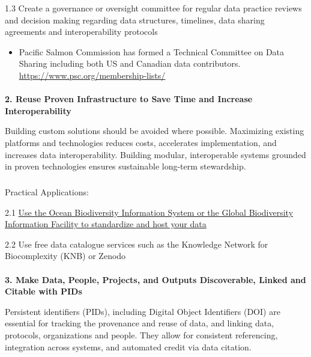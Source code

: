 \documentclass[
  letterpaper,
  DIV=11,
  numbers=noendperiod]{scrartcl}
\makeatletter
\let\oldparagraph\paragraph
\renewcommand{\paragraph}{
    \@ifstar
      \xxxParagraphStar
      \xxxParagraphNoStar
  }
\newcommand{\xxxParagraphStar}[1]{\oldparagraph*{#1}\mbox{}}
\newcommand{\xxxParagraphNoStar}[1]{\oldparagraph{#1}\mbox{}}
\let\oldsubparagraph\subparagraph
\renewcommand{\subparagraph}{
    \@ifstar
      \xxxSubParagraphStar
      \xxxSubParagraphNoStar
  }
\newcommand{\xxxSubParagraphStar}[1]{\oldsubparagraph*{#1}\mbox{}}
\newcommand{\xxxSubParagraphNoStar}[1]{\oldsubparagraph{#1}\mbox{}}
\providecommand{\tightlist}{%
  \setlength{\itemsep}{0pt}\setlength{\parskip}{0pt}}\usepackage{longtable,booktabs,array}
\makeatother
\begin{document}
1.3 Create a governance or oversight committee for regular data practice
reviews and decision making regarding data structures, timelines, data
sharing agreements and interoperability protocols

\begin{itemize}
\tightlist
\item
  Pacific Salmon Commission has formed a Technical Committee on Data
  Sharing including both US and Canadian data contributors.
  \url{https://www.psc.org/membership-lists/}
\end{itemize}

\paragraph{\texorpdfstring{\textbf{2. Reuse Proven Infrastructure to
Save Time and Increase
Interoperability}}{2. Reuse Proven Infrastructure to Save Time and Increase Interoperability}}\label{reuse-proven-infrastructure-to-save-time-and-increase-interoperability}

Building custom solutions should be avoided where possible. Maximizing
existing platforms and technologies reduces costs, accelerates
implementation, and increases data interoperability. Building modular,
interoperable systems grounded in proven technologies ensures
sustainable long-term stewardship.

\subparagraph{Practical Applications:}\label{practical-applications-1}

2.1 \href{https://doi.org/10.14286/duc6mu}{Use the Ocean Biodiversity
Information System or the Global Biodiversity Information Facility to
standardize and host your data}

2.2 Use free data catalogue services such as the Knowledge Network for
Biocomplexity (KNB) or Zenodo

\paragraph{\texorpdfstring{\textbf{3. Make Data, People, Projects, and
Outputs Discoverable, Linked and Citable with
PIDs}}{3. Make Data, People, Projects, and Outputs Discoverable, Linked and Citable with PIDs}}\label{make-data-people-projects-and-outputs-discoverable-linked-and-citable-with-pids}

Persistent identifiers (PIDs), including Digital Object Identifiers
(DOI) are essential for tracking the provenance and reuse of data, and
linking data, protocols, organizations and people. They allow for
consistent referencing, integration across systems, and automated credit
via data citation.
\end{document}
